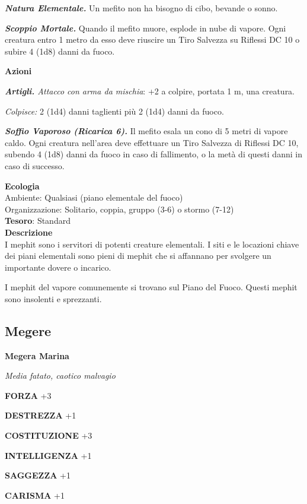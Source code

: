 \begin{multicols}{2}
	\textit{\textbf{Natura Elementale.}} Un mefito non ha bisogno di cibo, bevande o sonno.

	\textit{\textbf{Scoppio Mortale.}} Quando il mefito muore, esplode in nube di vapore. Ogni creatura entro 1 metro da esso deve riuscire un Tiro Salvezza su Riflessi DC 10 o subire 4 (1d8) danni da fuoco.

	\textbf{Azioni}

	\textit{\textbf{Artigli.} Attacco con arma da mischia}: +2 a colpire, portata 1 m, una creatura.

	\textit{Colpisce:} 2 (1d4) danni taglienti più 2 (1d4) danni da fuoco.

	\textit{\textbf{Soffio Vaporoso (Ricarica 6).}} Il mefito esala un cono di 5 metri di vapore caldo. Ogni creatura nell'area deve effettuare un Tiro Salvezza di Riflessi DC 10, subendo 4 (1d8) danni da fuoco in caso di fallimento, o la metà di questi danni in caso di successo.

	\textbf{Ecologia}\\
	Ambiente: Qualsiasi (piano elementale del fuoco)\\
	Organizzazione: Solitario, coppia, gruppo (3-6) o stormo (7-12)\\
	\textbf{Tesoro}: Standard\\
	\textbf{Descrizione}\\
	I mephit sono i servitori di potenti creature elementali. I siti e le locazioni chiave dei piani elementali sono pieni di mephit che si affannano per svolgere un importante dovere o incarico.

	I mephit del vapore comunemente si trovano sul Piano del Fuoco. Questi mephit sono insolenti e sprezzanti.



	\subsection{Megere}

	\medskip{}\textbf{Megera Marina}

	\textit{Media fatato, caotico malvagio}

	\textbf{FORZA} +3

	\textbf{DESTREZZA} +1

	\textbf{COSTITUZIONE} +3

	\textbf{INTELLIGENZA} +1

	\textbf{SAGGEZZA} +1

	\textbf{CARISMA} +1


\end{multicols}

